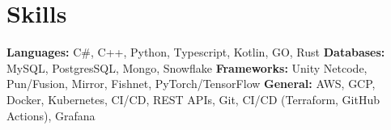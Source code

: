 \vspace{5 pt - 0.3 cm}
\section{Skills}
\begin{onecolentry}
    \textbf{Languages:} C\#, C++, Python, Typescript, Kotlin, GO, Rust \newline
    \textbf{Databases:} MySQL, PostgresSQL, Mongo, Snowflake \newline
    \textbf{Frameworks:} Unity Netcode, Pun/Fusion, Mirror, Fishnet, PyTorch/TensorFlow  \newline
    \textbf{General:} AWS, GCP, Docker, Kubernetes, CI/CD, REST APIs, Git, CI/CD (Terraform, GitHub Actions), Grafana \newline
\end{onecolentry}
